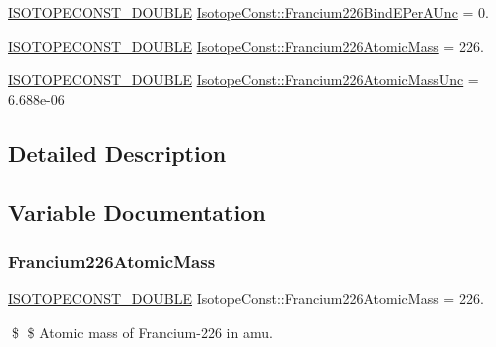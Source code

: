 \begin{DoxyCompactItemize}
\mbox{\hyperlink{group___isotope_const-_macros_ga8f45a7272ce02c0b4c65c44636ed719a}{I\+S\+O\+T\+O\+P\+E\+C\+O\+N\+S\+T\+\_\+\+D\+O\+U\+B\+LE}} \mbox{\hyperlink{group___isotope_const-_francium-_fr226_gaa8289a845948a47904708889b8316180}{Isotope\+Const\+::\+Francium226\+Bind\+E\+Per\+A\+Unc}} = 0.
\item 
\mbox{\hyperlink{group___isotope_const-_macros_ga8f45a7272ce02c0b4c65c44636ed719a}{I\+S\+O\+T\+O\+P\+E\+C\+O\+N\+S\+T\+\_\+\+D\+O\+U\+B\+LE}} \mbox{\hyperlink{group___isotope_const-_francium-_fr226_ga9e89b78c8e4d6b36e09a2d86d46d36a1}{Isotope\+Const\+::\+Francium226\+Atomic\+Mass}} = 226.
\item 
\mbox{\hyperlink{group___isotope_const-_macros_ga8f45a7272ce02c0b4c65c44636ed719a}{I\+S\+O\+T\+O\+P\+E\+C\+O\+N\+S\+T\+\_\+\+D\+O\+U\+B\+LE}} \mbox{\hyperlink{group___isotope_const-_francium-_fr226_gaa9eb25d8099b54f208d596d679e87535}{Isotope\+Const\+::\+Francium226\+Atomic\+Mass\+Unc}} = 6.\+688e-\/06
\end{DoxyCompactItemize}


\subsection{Detailed Description}


\subsection{Variable Documentation}
\mbox{\label{group___isotope_const-_francium-_fr226_ga9e89b78c8e4d6b36e09a2d86d46d36a1}} 
\subsubsection{\texorpdfstring{Francium226\+Atomic\+Mass}{Francium226AtomicMass}}
{\footnotesize\ttfamily \mbox{\hyperlink{group___isotope_const-_macros_ga8f45a7272ce02c0b4c65c44636ed719a}{I\+S\+O\+T\+O\+P\+E\+C\+O\+N\+S\+T\+\_\+\+D\+O\+U\+B\+LE}} Isotope\+Const\+::\+Francium226\+Atomic\+Mass = 226.}

\$ \$ Atomic mass of Francium-\/226 in amu. \mbox{\label{group___isotope_const-_francium-_fr226_gaa9eb25d8099b54f208d596d679e87535}} 
